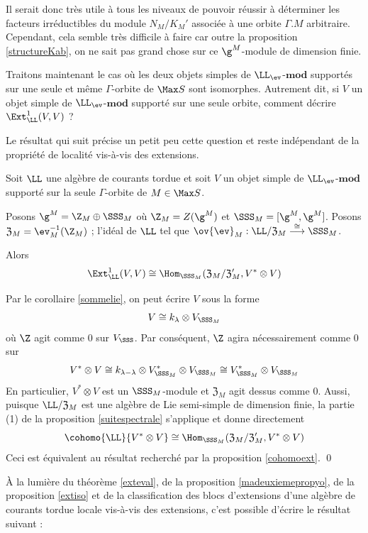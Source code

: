 Il serait donc très utile à tous les niveaux de pouvoir réussir à déterminer les facteurs irréductibles du module $N_M/K_M'$ associée à une orbite $\Gamma.M$ arbitraire. Cependant, cela semble très difficile à faire car outre la proposition \ref{structureKab}, on ne sait pas grand chose sur ce $\g^M$-module de dimension finie.

Traitons maintenant le cas où les deux objets simples de $\LL_{\ev}$-$\mathbf{mod}$ supportés sur une seule et même $\Gamma$-orbite de $\Max S$ sont isomorphes. Autrement dit, si $V$ un objet simple de $\LL_{\ev}$-$\mathbf{mod}$ supporté sur une seule orbite, comment décrire $\Ext_\LL^1(V,V)$ ? 

Le résultat qui suit précise un petit peu cette question et reste indépendant de la propriété de localité vis-à-vis des extensions. 

\begin{Prop} \label{extiso} Soit $\LL$ une algèbre de courants tordue et soit $V$ un objet simple de \linebreak $\LL_{\ev}$-$\mathbf{mod}$ supporté sur la seule $\Gamma$-orbite de $M \in \Max S$. 

Posons $\g^M = \Z_M \oplus \SSS_M$ où $\Z_M = Z(\g^M)$ et $\SSS_M = [\g^M,\g^M]$. Posons $\mathfrak{Z}_M = \ev_M^{-1}(\Z_M)$ ; l'idéal de $\LL$ tel que $\ov{\ev}_M : \LL/\mathfrak{Z}_M \stackrel{\cong}{\longrightarrow} \SSS_M$. 

Alors
$$ \Ext_\LL^1(V,V) \cong \Hom_{\SSS_M}(\mathfrak{Z}_M/\mathfrak{Z}_M',V^* \otimes V) $$
\begin{pre} Par le corollaire \ref{sommelie}, on peut écrire $V$ sous la forme
$$ V \cong k_\lambda \otimes V_{\SSS_M} $$
où $\Z$ agit comme 0 sur $V_\SSS$. Par conséquent, $\Z$ agira nécessairement comme 0 sur 
$$ V^* \otimes V \cong k_{\lambda - \lambda} \otimes V_{\SSS_M}^* \otimes V_{\SSS_M} \cong V_{\SSS_M}^* \otimes V_{\SSS_M} $$
En particulier, $V^* \otimes V$ est un $\SSS_M$-module et $\mathfrak{Z}_M$ agit dessus comme 0. Aussi, puisque $\LL/\mathfrak{Z}_M$ est une algèbre de Lie semi-simple de dimension finie, la partie (1) de la proposition \ref{suitespectrale} s'applique et donne directement
$$ \cohomo{\LL}{V^* \otimes V} \cong \Hom_{\SSS_M}(\mathfrak{Z}_M/\mathfrak{Z}_M',V^* \otimes V) $$
Ceci est équivalent au résultat recherché par la proposition \ref{cohomoext}. \qed
\end{pre} 
\end{Prop}

À la lumière du théorème \ref{exteval}, de la proposition \ref{madeuxiemepropyo}, de la proposition \ref{extiso} et de la classification des blocs d'extensions d'une algèbre de courants tordue locale vis-à-vis des extensions, c'est possible d'écrire le résultat suivant :

